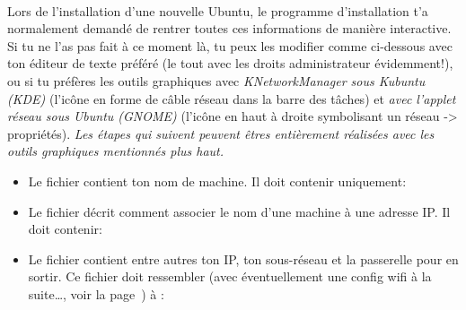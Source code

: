\paragraph{}
\label{Ubuntu:IP}

Lors de l'installation d'une nouvelle Ubuntu, le programme d'installation t'a normalement demand\'e de rentrer toutes ces informations de mani\`ere
interactive. Si tu ne l'as pas fait \`a ce moment l\`a, tu peux les modifier comme ci-dessous avec ton \'editeur de texte pr\'ef\'er\'e (le tout avec les droits
administrateur \'evidemment!), ou si tu pr\'ef\`eres les outils graphiques avec \emph{KNetworkManager sous Kubuntu (KDE)} (l'ic\^one en forme de c\^able r\'eseau dans
la barre des t\^aches) et \emph{avec l'applet r\'eseau sous Ubuntu (GNOME)} (l'ic\^one en haut \`a droite symbolisant un r\'eseau -> propri\'et\'es).
\newline
\newline
\textit{Les \'etapes qui suivent peuvent \^etres enti\`erement r\'ealis\'ees avec les outils graphiques mentionn\'es plus haut.}
\newline
\begin{itemize}
\item Le fichier  contient ton nom de machine. Il doit contenir uniquement:


\item Le fichier  d\'ecrit comment associer le nom d'une machine \`a une adresse IP.
Il doit contenir:


\item Le fichier  contient entre autres ton IP,
ton sous-r\'eseau et la passerelle pour en sortir. Ce fichier doit
ressembler (avec \'eventuellement une config wifi \`a la suite\ldots,
voir la page~\pageref{wifi}) \`a :


\end{itemize}

